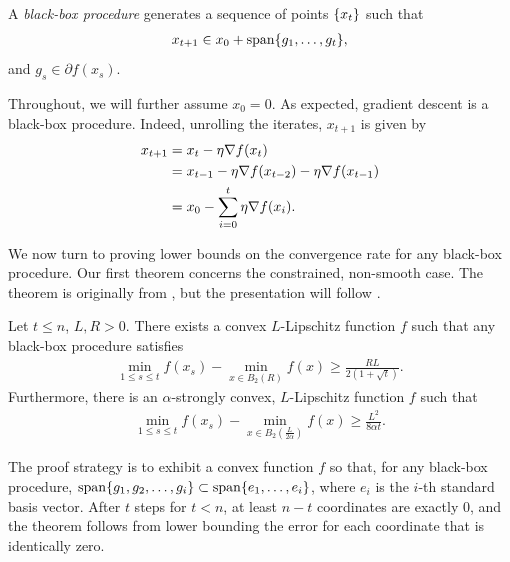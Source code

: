 \begin{definition}
A \textit{black-box procedure} generates a sequence of points $\{x_t\}$
such that
\begin{align*}
    x_{t+1} \in x_0 + \mathop{\rm span}\{g_1, \dots, g_t\},
\end{align*}
and $g_s \in \partial f (x_s)$.
\end{definition}
Throughout, we will further assume $x_0 = 0$. As expected, gradient descent is a
black-box procedure. Indeed, unrolling the iterates, $x_{t+1}$ is given by
\begin{align*}
    x_{t+1} 
    &= x_t - \eta \nabla f(x_t) \\
    &= x_{t-1} - \eta \nabla f(x_{t-2}) - \eta \nabla f(x_{t-1}) \\
    &= x_0 - \sum_{i=0}^t \eta \nabla f (x_i).
\end{align*}

We now turn to proving lower bounds on the convergence rate for any 
black-box procedure.
Our first theorem concerns the constrained, non-smooth case.
The theorem is originally from \cite{nesterov83}, but the presentation will
follow \cite{nesterov04}.
~
\begin{theorem}
Let $t \leq n$, $L, R  > 0$. There exists a convex $L$-Lipschitz function $f$
such that any black-box procedure satisfies
\begin{align}
    \min_{1 \leq s \leq t} f(x_s) - \min_{x \in B_2(R)} f(x)
    \geq \frac{RL}{2(1+\sqrt{t})}.
\end{align}
Furthermore, there is an $\alpha$-strongly convex, $L$-Lipschitz function $f$
such that
\begin{align}
    \min_{1 \leq s \leq t} f(x_s) - \min_{x \in B_2(\frac{L}{2\alpha})} f(x)
    \geq \frac{L^2}{8\alpha t}.
\end{align}
\end{theorem}
The proof strategy is to exhibit a convex function $f$ so that, for any black-box procedure,
$\mathop{\rm span}\{g_1, g_2, \dots, g_i\} \subset \mathop{\rm span}\{e_1, \dots, e_i\}$, where
$e_i$ is the $i$-th standard basis vector. After $t$ steps for $t < n$, at least
$n-t$ coordinates are exactly 0, and the theorem follows from lower bounding the
error for each coordinate that is identically zero. 

